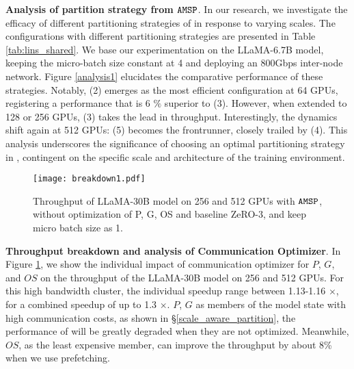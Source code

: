 \noindent\textbf{Analysis of partition strategy from $\texttt{AMSP}$}.
In our research, we investigate the efficacy of different partitioning strategies of \SysName in response to varying scales. The \SysName configurations with different partitioning strategies are presented in Table \ref{tab:lins_shared}.
We base our experimentation on the LLaMA-6.7B model, keeping the micro-batch size constant at 4 and deploying an 800Gbps inter-node network. Figure \ref{analysis1} elucidates the comparative performance of these strategies. Notably, \SysName(2) emerges as the most efficient configuration at 64 GPUs, registering a performance that is 6 $\%$ superior to \SysName(3). However, when extended to 128 or 256 GPUs, \SysName(3) takes the lead in throughput. Interestingly, the dynamics shift again at 512 GPUs: \SysName(5) becomes the frontrunner, closely trailed by \SysName(4). This analysis underscores the significance of choosing an optimal partitioning strategy in \SysName, contingent on the specific scale and architecture of the training environment.


\begin{figure}[t]
    \centering
    \texttt{[image: breakdown1.pdf]}
    \caption{Throughput of LLaMA-30B model on 256 and 512 GPUs with $\texttt{AMSP}$, without optimization of P, G, OS and baseline ZeRO-3, and keep micro batch size as 1.}
    \label{breakdown}
\end{figure}

\noindent\textbf{Throughput breakdown and analysis of Communication Optimizer}.
In Figure \ref{breakdown}, we show the individual impact of communication optimizer for $P$, $G$, and $OS$ on the throughput of the LLaMA-30B model on 256 and 512 GPUs. 
For this high bandwidth cluster, the individual speedup range between 1.13-1.16 $\times$, for a combined speedup of up to 1.3 $\times$.  
$P$, $G$ as members of the model state with high communication costs, as shown in \S\ref{scale_aware_partition}, the performance of \SysName will be greatly degraded when they are not optimized. Meanwhile, $OS$, as the least expensive member, can improve the throughput by about 8\% when we use prefetching.


